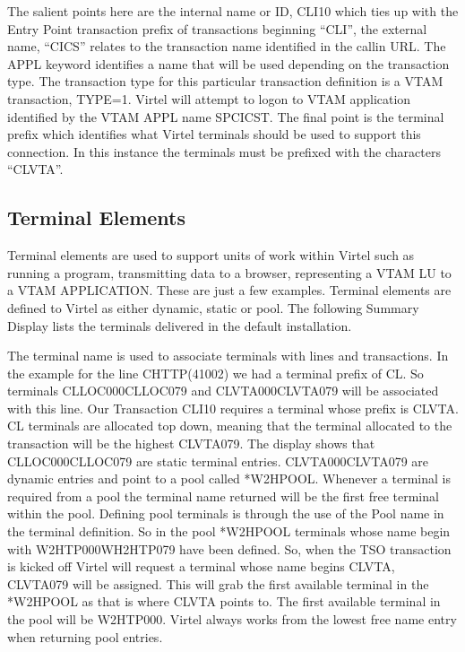 \documentclass[letterpaper,10pt,english]{sphinxmanual}
\begin{document}
\sphinxAtStartPar
The salient points here are the internal name or ID, CLI\sphinxhyphen{}10 which ties up with the Entry Point transaction prefix of transactions beginning “CLI”, the external name, “CICS” relates to the transaction name identified in the call\sphinxhyphen{}in URL. The APPL keyword identifies a name that will be used depending on the transaction type. The transaction type for this particular transaction definition is a VTAM transaction, TYPE=1. Virtel will attempt to logon to VTAM application identified by the VTAM APPL name SPCICST. The final point is the terminal prefix which identifies what Virtel terminals should be used to support this connection. In this instance the terminals must be prefixed with the characters “CLVTA”.


\subsection{Terminal Elements}
\label{\detokenize{connectivity_guide:terminal-elements}}
\sphinxAtStartPar
Terminal elements are used to support units of work within Virtel such as running a program, transmitting data to a browser, representing a VTAM LU to a VTAM APPLICATION. These are just a few examples. Terminal elements are defined to Virtel as either dynamic, static or pool. The following Summary Display lists the terminals delivered in the default installation.

\sphinxAtStartPar
{}

\sphinxAtStartPar
The terminal name is used to associate terminals with lines and transactions. In the example for the line C\sphinxhyphen{}HTTP(41002) we had a terminal prefix of CL. So terminals CLLOC000\sphinxhyphen{}CLLOC079 and CLVTA000\sphinxhyphen{}CLVTA079 will be associated with this line. Our Transaction CLI\sphinxhyphen{}10 requires a terminal whose prefix is CLVTA. CL terminals are allocated top down, meaning that the terminal allocated to the transaction will be the highest CLVTA079. The display shows that CLLOC000\sphinxhyphen{}CLLOC079 are static terminal entries. CLVTA000\sphinxhyphen{}CLVTA079 are dynamic entries and point to a pool called *W2HPOOL. Whenever a terminal is required from a pool the terminal name returned will be the first free terminal within the pool. Defining pool terminals is through the use of the Pool name in the terminal definition. So in the pool *W2HPOOL terminals whose name begin with W2HTP000\sphinxhyphen{}WH2HTP079 have been defined. So, when the TSO transaction is kicked off Virtel will request a terminal whose name begins CLVTA, CLVTA079 will be assigned. This will grab the first available terminal in the *W2HPOOL as that is where CLVTA points to. The first available terminal in the pool will be W2HTP000. Virtel always works from the lowest free name entry when returning pool entries.
\end{document}
